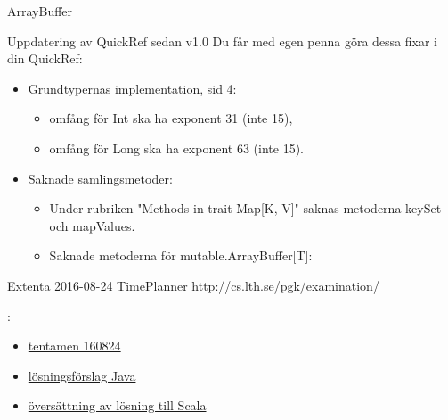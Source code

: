 \begin{Slide}{ArrayBuffer}\SlideFontSmall
\end{Slide}

\begin{Slide}{Uppdatering av QuickRef sedan v1.0}
Du får med egen penna göra dessa fixar i din QuickRef:
\begin{itemize}
\item Grundtypernas implementation, sid 4: 
\begin{itemize}

\item omfång för Int ska ha exponent 31 (inte 15), 
\item omfång för Long ska ha exponent 63 (inte 15).
\end{itemize}

\item Saknade samlingsmetoder: 
\begin{itemize}
\item Under rubriken "Methods in trait Map[K, V]" saknas metoderna keySet och mapValues. 
\item Saknade metoderna för mutable.ArrayBuffer[T]:   \code{}
\end{itemize}
\end{itemize}
\end{Slide}



\begin{Slide}{Extenta 2016-08-24 TimePlanner}\SlideFontSmall
\url{http://cs.lth.se/pgk/examination/}

\vspace{1em}: 
\begin{itemize}
\item \href{}{tentamen 160824} 
\item \href{}{lösningsförslag Java} 
\item \href{}{översättning av lösning till Scala}
\end{itemize}
\end{Slide}

\fi
